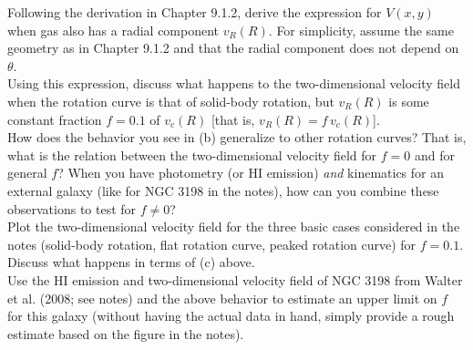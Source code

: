 \documentclass[12pt]{article}
\begin{document}
 Following the derivation in Chapter 9.1.2, derive
the expression for $V(x,y)$ when gas also has a radial component
$v_R(R)$. For simplicity, assume the same geometry as in Chapter 9.1.2
and that the radial component does not depend on $\theta$.\\

 Using this expression, discuss what happens to the
two-dimensional velocity field when the rotation curve is that of
solid-body rotation, but $v_R(R)$ is some constant fraction $f=0.1$ of
$v_c(R)$ [that is, $v_R(R) = f\,v_c(R)$].\\

 How does the behavior you see in (b) generalize to
other rotation curves? That is, what is the relation between the
two-dimensional velocity field for $f=0$ and for general $f$? When you
have photometry (or HI emission) \emph{and} kinematics for an external
galaxy (like for NGC 3198 in the notes), how can you combine these
observations to test for $f \neq 0$?\\

 Plot the two-dimensional velocity field for the
three basic cases considered in the notes (solid-body rotation, flat
rotation curve, peaked rotation curve) for $f=0.1$. Discuss what
happens in terms of (c) above.\\

 Use the HI emission and two-dimensional velocity
field of NGC 3198 from Walter et al. (2008; see notes) and the above
behavior to estimate an upper limit on $f$ for this galaxy (without
having the actual data in hand, simply provide a rough estimate based
on the figure in the notes).\\
\end{document}
